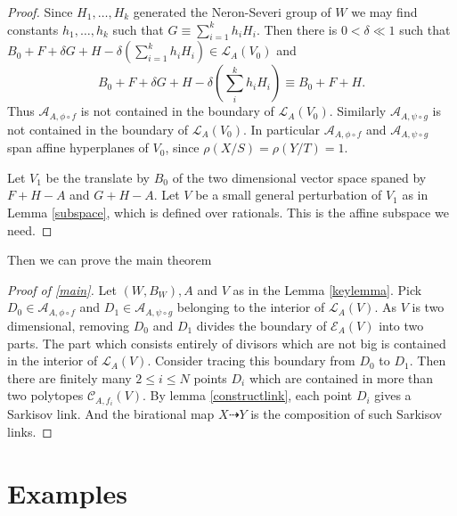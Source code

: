 \documentclass{article}
\begin{document}
\begin{proof}
Since $H_{1},\ldots ,H_{k}$ generated the Neron-Severi group of $W$ we may find constants $h_{1},\ldots ,h_{k}$ such that $G \equiv \sum^{k}_{i=1} h_{i}H_{i}$. Then there is $0< \delta\ll 1$ such that  $B_{0}+F+\delta G+H- \delta(\sum_{i=1}^{k} h_{i}H_{i}) \in \mathcal{L}_{A}(V_{0})$ and
\[
  B_{0}+F+\delta G+H-\delta (\sum_i^k h_{i}H_{i}) \equiv B_{0}+F+H
.\]
Thus $\mathcal{A}_{A,\phi\circ f}$ is not contained in the boundary of $\mathcal{L}_{A}(V_{0})$. Similarly $\mathcal{A}_{A,\psi\circ g}$ is not contained in the boundary of $\mathcal{L}_{A}(V_{0})$. In particular $\mathcal{A}_{A,\phi\circ f}$ and   $\mathcal{A}_{A,\psi\circ g}$ span affine hyperplanes of $V_{0}$, since $\rho(X/S)=\rho(Y/T)=1$.

Let $V_{1}$ be the translate by $B_{0}$ of the two dimensional vector space spaned by $F+H-A$ and $G+H-A$. Let $V$ be a small general perturbation of $V_{1}$ as in Lemma \ref{subspace}, which is defined over rationals. This is the affine subspace we need.
\end{proof}
Then we can prove the main theorem
\begin{proof}[Proof of \ref{main}]
Let $(W,B_{W}),A $ and $V$ as in the Lemma \ref{keylemma}.  Pick $ D_{0} \in \mathcal{A}_{A,\phi\circ f} $  and $ D_1\in \mathcal{A}_{A,\psi\circ g} $ belonging to the interior of $ \mathcal{L}_A(V) $. As $ V $ is two dimensional, removing $ D_0 $ and $ D_1 $ divides the boundary of $ \mathcal{E}_A(V) $ into two parts. The part which consists entirely of divisors which are not big is contained in the interior of $ \mathcal{L}_A(V) $. Consider tracing this boundary from $ D_0 $ to $ D_1 $. Then there are finitely many $ 2\leqslant i\leqslant N $ points $ D_i $ which are contained in more than two polytopes $ \mathcal{C}_{A,f_i}(V) $. By lemma \ref{constructlink},  each point $ D_i $ gives a Sarkisov link. And the birational map $X \dashrightarrow Y$ is the composition of such Sarkisov links.
\end{proof}

\section{Examples}




\end{document}
